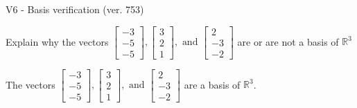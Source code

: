 \begin{exercise}
  \begin{exerciseTitle}V6 - Basis verification (ver. 753)\end{exerciseTitle}
  \begin{exerciseStatement}
    Explain why the vectors \(\left[\begin{array}{r}
-3 \\
-5 \\
-5
\end{array}\right] , \left[\begin{array}{r}
3 \\
2 \\
1
\end{array}\right] , \text{ and } \left[\begin{array}{r}
2 \\
-3 \\
-2
\end{array}\right]\) are or are not a basis of \(\mathbb{R}^3\)	


  \end{exerciseStatement}
  \begin{exerciseAnswer}
   The vectors \(\left[\begin{array}{r}
-3 \\
-5 \\
-5
\end{array}\right] , \left[\begin{array}{r}
3 \\
2 \\
1
\end{array}\right] , \text{ and } \left[\begin{array}{r}
2 \\
-3 \\
-2
\end{array}\right]\) 
  	 are  a basis of \(\mathbb{R}^3\).
  


  \end{exerciseAnswer}
\end{exercise}